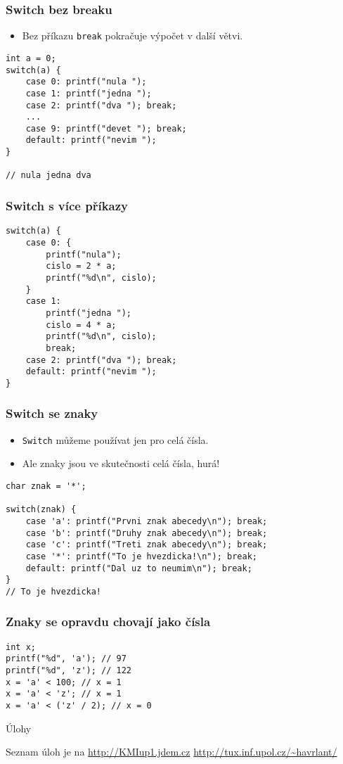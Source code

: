 \documentclass{beamer}
\newenvironment{itemizex}%
  {\large \begin{itemize}%
    \setlength{\itemsep}{8pt}%
    \setlength{\parskip}{8pt}}%
  {\end{itemize}}
\begin{document}
\begin{frame}[t,fragile]\frametitle{Switch bez breaku} 
\begin{itemizex}
  \item Bez příkazu \texttt{break} pokračuje výpočet v další větvi.
\end{itemizex}
\begin{verbatim} 
int a = 0;
switch(a) {
    case 0: printf("nula ");
    case 1: printf("jedna ");
    case 2: printf("dva "); break;
    ...
    case 9: printf("devet "); break;
    default: printf("nevim ");
}

// nula jedna dva 
\end{verbatim}
\end{frame}


\begin{frame}[t,fragile]\frametitle{Switch s více příkazy} 
  \begin{verbatim} 
switch(a) {
    case 0: {
        printf("nula");
        cislo = 2 * a;
        printf("%d\n", cislo);
    }
    case 1: 
        printf("jedna ");
        cislo = 4 * a;
        printf("%d\n", cislo);
        break;
    case 2: printf("dva "); break;
    default: printf("nevim ");
}
  \end{verbatim}
\end{frame}


\begin{frame}[t,fragile]\frametitle{Switch se znaky} 
  \begin{itemize}
    \item \texttt{Switch} můžeme používat jen pro celá čísla.
    \item Ale znaky jsou ve skutečnosti celá čísla, hurá!
  \end{itemize}
  \begin{verbatim} 
char znak = '*';

switch(znak) {
    case 'a': printf("Prvni znak abecedy\n"); break;
    case 'b': printf("Druhy znak abecedy\n"); break;
    case 'c': printf("Treti znak abecedy\n"); break;
    case '*': printf("To je hvezdicka!\n"); break;
    default: printf("Dal uz to neumim\n"); break;
}
// To je hvezdicka!
  \end{verbatim}
\end{frame}



\begin{frame}[t,fragile]\frametitle{Znaky se opravdu chovají jako čísla} 
  \begin{verbatim} 
int x;
printf("%d", 'a'); // 97
printf("%d", 'z'); // 122
x = 'a' < 100; // x = 1
x = 'a' < 'z'; // x = 1
x = 'a' < ('z' / 2); // x = 0
  \end{verbatim}
\end{frame}


\begin{frame}[t,fragile]{Úlohy}
\begin{center}
\vskip 1cm
{\Large Seznam úloh je na \url{http://KMIup1.jdem.cz}}
\vskip 2cm
\url{http://tux.inf.upol.cz/~havrlant/}
\end{center}
\end{frame}
\end{document}
